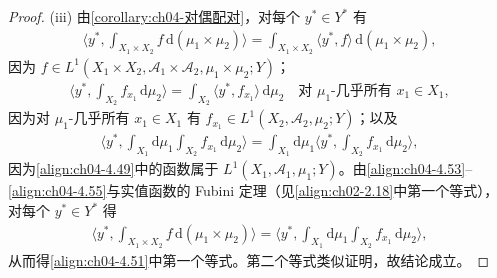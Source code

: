 \documentclass[../../main.tex]{subfiles}%
\begin{document}
\begin{proof}
(iii) 由\cref{corollary:ch04-对偶配对}，对每个 $y^*\in Y^*$ 有
\begin{align}
\Big\langle y^*,\int_{X_1\times X_2}f\,\mathrm{d}(\mu_1\times\mu_2)\Big\rangle=\int_{X_1\times X_2}\langle y^*,f\rangle\,\mathrm{d}(\mu_1\times\mu_2), \label{align:ch04-4.53}
\end{align}
因为 $f\in L^1(X_1\times X_2,\mathcal{A}_1\times\mathcal{A}_2,\mu_1\times\mu_2;Y)$；
\begin{align}
\Big\langle y^*,\int_{X_2}f_{x_1}\,\mathrm{d}\mu_2\Big\rangle=\int_{X_2}\langle y^*,f_{x_1}\rangle\,\mathrm{d}\mu_2\quad\text{对 }\mu_1\text{-几乎所有 }x_1\in X_1, \label{align:ch04-4.54}
\end{align}
因为对 $\mu_1$-几乎所有 $x_1\in X_1$ 有 $f_{x_1}\in L^1(X_2,\mathcal{A}_2,\mu_2;Y)$；以及
\begin{align}
\Big\langle y^*,\int_{X_1}\mathrm{d}\mu_1\int_{X_2}f_{x_1}\,\mathrm{d}\mu_2\Big\rangle=\int_{X_1}\mathrm{d}\mu_1\Big\langle y^*,\int_{X_2}f_{x_1}\,\mathrm{d}\mu_2\Big\rangle, \label{align:ch04-4.55}
\end{align}
因为\eqref{align:ch04-4.49}中的函数属于 $L^1(X_1,\mathcal{A}_1,\mu_1;Y)$。由\eqref{align:ch04-4.53}--\eqref{align:ch04-4.55}与实值函数的 Fubini 定理（见\eqref{align:ch02-2.18}中第一个等式），对每个 $y^*\in Y^*$ 得
\begin{align*}
\Big\langle y^*,\int_{X_1\times X_2}f\,\mathrm{d}(\mu_1\times\mu_2)\Big\rangle=\Big\langle y^*,\int_{X_1}\mathrm{d}\mu_1\int_{X_2}f_{x_1}\,\mathrm{d}\mu_2\Big\rangle,
\end{align*}
从而得\eqref{align:ch04-4.51}中第一个等式。第二个等式类似证明，故结论成立。
\end{proof}
\end{document}
